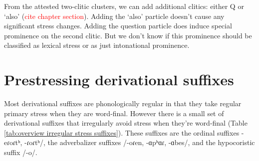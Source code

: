 From the attested  two-clitic clusters, we can add additional clitics: either Q or `also' (\textcolor{red}{cite chapter section}). Adding the `also' particle doesn't cause any significant stress changes. Adding the question particle does induce special prominence on the second clitic. But we don't know if this prominence should be classified as lexical stress or as just intonational prominence. 



\section{Prestressing derivational suffixes}\label{section:stress:prestress}
Most derivational suffixes are phonologically regular in that they take regular primary stress when they are word-final. However there is a small set of derivational suffixes that irregularly avoid stress when they're word-final (Table \ref{tab:overview irregular stress suffixes}). These suffixes are the ordinal suffixes -eɾoɾtʰ, -ɾoɾtʰ/,  the adverbalizer suffixes /-oɾen, -ɑpʰɑɾ, -ɑbes/, and the hypocoristic suffix /-o/. 

\begin{table}[H]
	\centering
	\caption{Prestressing derivational suffixes which avoid stress when word-final}
	\label{tab:overview irregular stress suffixes}
\end{table}

